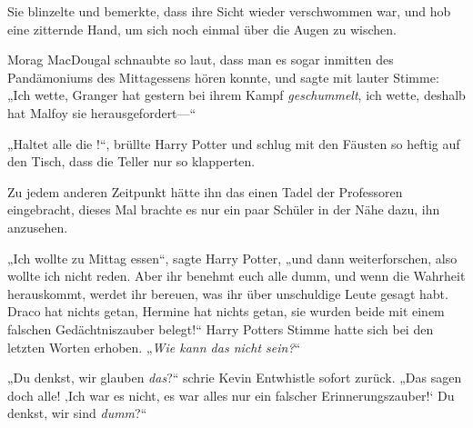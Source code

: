Sie blinzelte und bemerkte, dass ihre Sicht wieder verschwommen war, und hob eine zitternde Hand, um sich noch einmal über die Augen zu wischen.

Morag MacDougal schnaubte so laut, dass man es sogar inmitten des Pandämoniums des Mittagessens hören konnte, und sagte mit lauter Stimme:
„Ich wette, Granger hat gestern bei ihrem Kampf \emph{geschummelt}, ich wette, deshalb hat Malfoy sie herausgefordert—“

„Haltet alle die !“, brüllte Harry Potter und schlug mit den Fäusten so heftig auf den Tisch, dass die Teller nur so klapperten.

Zu jedem anderen Zeitpunkt hätte ihn das einen Tadel der Professoren eingebracht, dieses Mal brachte es nur ein paar Schüler in der Nähe dazu, ihn anzusehen.

„Ich wollte zu Mittag essen“, sagte Harry Potter, „und dann weiterforschen, also wollte ich nicht reden. Aber ihr benehmt euch alle dumm, und wenn die Wahrheit herauskommt, werdet ihr bereuen, was ihr über unschuldige Leute gesagt habt. Draco hat nichts getan, Hermine hat nichts getan, sie wurden beide mit einem falschen Gedächtniszauber belegt!“ Harry Potters Stimme hatte sich bei den letzten Worten erhoben. „\emph{Wie kann das nicht  sein?}“

„Du denkst, wir glauben \emph{das}?“ schrie Kevin Entwhistle sofort zurück.
„Das sagen doch alle! ‚Ich war es nicht, es war alles nur ein falscher Erinnerungszauber!‘ Du denkst, wir sind \emph{dumm}?“

